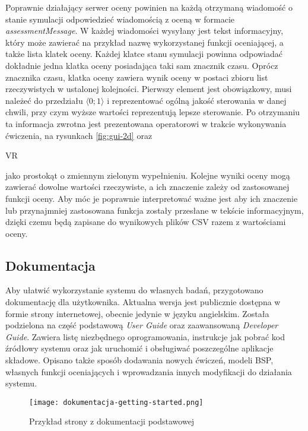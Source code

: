 Poprawnie działający serwer oceny powinien na każdą otrzymaną wiadomość o stanie symulacji odpowiedzieć wiadomością z oceną w formacie \emph{assessmentMessage}. W każdej wiadomości wysyłany jest tekst informacyjny, który może zawierać na przykład nazwę wykorzystanej funkcji oceniającej, a także lista klatek oceny. Każdej klatce stanu symulacji powinna odpowiadać dokładnie jedna klatka oceny posiadająca taki sam znacznik czasu. Oprócz znacznika czasu, klatka oceny zawiera wynik oceny w postaci zbioru list rzeczywistych w ustalonej kolejności. Pierwszy element jest obowiązkowy, musi należeć do przedziału $ \langle 0; 1 \rangle $ i reprezentować ogólną jakość sterowania w danej chwili, przy czym wyższe wartości reprezentują lepsze sterowanie. Po otrzymaniu ta informacja zwrotna jest prezentowana operatorowi w trakcie wykonywania ćwiczenia, na rysunkach \ref{fig:gui-2d} oraz \begin{todo}VR\end{todo} jako prostokąt o zmiennym zielonym wypełnieniu. Kolejne wyniki oceny mogą zawierać dowolne wartości rzeczywiste, a ich znaczenie zależy od zastosowanej funkcji oceny. Aby móc je poprawnie interpretować ważne jest aby ich znaczenie lub przynajmniej zastosowana funkcja zostały przesłane w tekście informacyjnym, dzięki czemu będą zapisane do wynikowych plików CSV razem z wartościami oceny.

\subsection{Dokumentacja}
Aby ułatwić wykorzystanie systemu do własnych badań, przygotowano dokumentację dla użytkownika. Aktualna wersja jest publicznie dostępna w formie strony internetowej\cite{uavdocs2021}, obecnie jedynie w języku angielskim. Została podzielona na część podstawową \emph{User Guide} oraz zaawansowaną \emph{Developer Guide}. Zawiera listę niezbędnego oprogramowania, instrukcje jak pobrać kod źródłowy systemu oraz jak uruchomić i obsługiwać poszczególne aplikacje składowe. Opisano także sposób dodawania nowych ćwiczeń, modeli BSP, własnych funkcji oceniających i wprowadzania innych modyfikacji do działania systemu.

\begin{figure}[!h]
    \caption{Przykład strony z dokumentacji podstawowej}
    \label{fig:dokumentacja-getting-started}
    \centering \texttt{[image: dokumentacja-getting-started.png]}
\end{figure}


